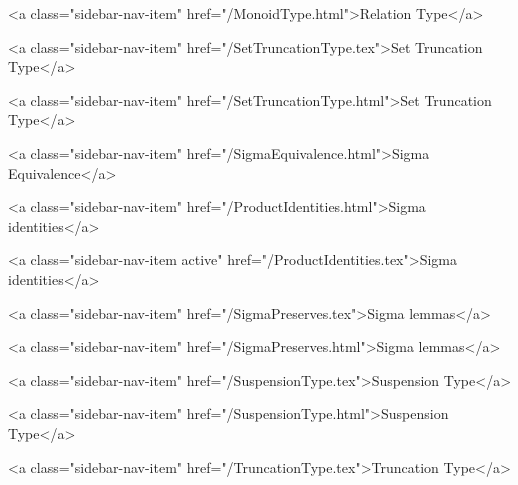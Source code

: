       
    
      
        
          <a class="sidebar-nav-item" href="/MonoidType.html">Relation Type</a>
        
      
    
      
        
          <a class="sidebar-nav-item" href="/SetTruncationType.tex">Set Truncation Type</a>
        
      
    
      
        
          <a class="sidebar-nav-item" href="/SetTruncationType.html">Set Truncation Type</a>
        
      
    
      
        
          <a class="sidebar-nav-item" href="/SigmaEquivalence.html">Sigma Equivalence</a>
        
      
    
      
        
          <a class="sidebar-nav-item" href="/ProductIdentities.html">Sigma identities</a>
        
      
    
      
        
          <a class="sidebar-nav-item active" href="/ProductIdentities.tex">Sigma identities</a>
        
      
    
      
        
          <a class="sidebar-nav-item" href="/SigmaPreserves.tex">Sigma lemmas</a>
        
      
    
      
        
          <a class="sidebar-nav-item" href="/SigmaPreserves.html">Sigma lemmas</a>
        
      
    
      
        
          <a class="sidebar-nav-item" href="/SuspensionType.tex">Suspension Type</a>
        
      
    
      
        
          <a class="sidebar-nav-item" href="/SuspensionType.html">Suspension Type</a>
        
      
    
      
        
          <a class="sidebar-nav-item" href="/TruncationType.tex">Truncation Type</a>
        
